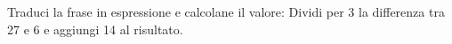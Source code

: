 \item Traduci la frase in espressione e calcolane il valore: Dividi per 3 la differenza tra 27 e 6 e aggiungi 14 al risultato.